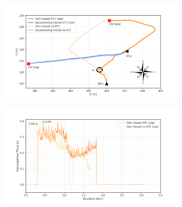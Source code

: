         \begin{figure}[H]
        \centering
        
            \begin{subfigure}[b]{0.49\textwidth}
                \centering
                \includegraphics[width=\textwidth]{figs/Chap5/plot_cr_w_vs_wo.png}
                \caption{}
                \label{fig:plot_cr_w_vs_wo}
            \end{subfigure}
            \begin{subfigure}[b]{0.49\textwidth}
                \centering
                \includegraphics[width=\textwidth]{figs/Chap5/plot_cr_w_vs_wo_CT.png}
                \caption{}
                \label{fig:plot_cr_w_vs_wo_CT}
            \end{subfigure}
            

\end{figure}
